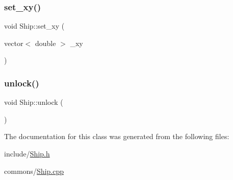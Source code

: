 \mbox{\label{class_ship_a2729dc6f1951abf423f8a8e2fe898f01}} 
\subsubsection{\texorpdfstring{set\_xy()}{set\_xy()}\hspace{0.1cm}{\footnotesize\ttfamily [2/2]}}
{\footnotesize\ttfamily void Ship\+::set\+\_\+xy (\begin{DoxyParamCaption}\item[{vector$<$ double $>$}]{\+\_\+xy }\end{DoxyParamCaption})}

\mbox{\label{class_ship_af47301f512437a323b5750684e5df992}} 
\subsubsection{\texorpdfstring{unlock()}{unlock()}}
{\footnotesize\ttfamily void Ship\+::unlock (\begin{DoxyParamCaption}{ }\end{DoxyParamCaption})\hspace{0.3cm}{\ttfamily [inline]}}



The documentation for this class was generated from the following files\+:\begin{DoxyCompactItemize}
\item 
include/\mbox{\hyperlink{_ship_8h}{Ship.\+h}}\item 
commons/\mbox{\hyperlink{_ship_8cpp}{Ship.\+cpp}}\end{DoxyCompactItemize}
